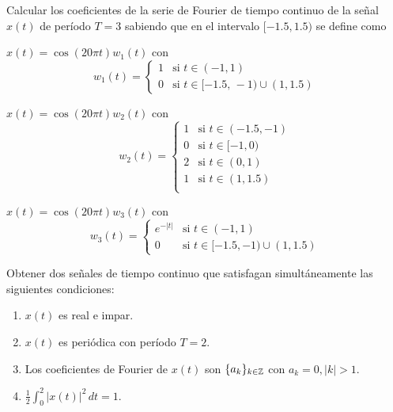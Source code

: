 \begin{ejercicio}
Calcular los coeficientes de la serie de Fourier de tiempo continuo de la señal $x(t)$ de período $T=3$ sabiendo que en el intervalo $[-1.5,1.5)$ se define como

\inciso $x(t) = \cos(20\pi t)w_1(t)$ con \begin{equation*}
    w_1(t) = \begin{cases}
    1 & \mbox{si } t \in (-1,1) \\
    0 & \mbox{si } t \in [-1.5,\,-1) \cup (1,1.5)
    \end{cases}
\end{equation*}

\inciso $x(t) = \cos(20\pi t)w_2(t)$ con \begin{equation*}
    w_2(t) = \begin{cases}
    1 & \mbox{si } t \in (-1.5,-1) \\
    0 & \mbox{si } t \in [-1,0) \\
    2 & \mbox{si } t \in (0,1) \\
    1 & \mbox{si } t \in (1,1.5) \\
    \end{cases}
\end{equation*}

\inciso $x(t) = \cos(20\pi t)w_3(t)$ con \begin{equation*}
    w_3(t) = \begin{cases}
    e^{-|t|} & \mbox{si } t \in (-1,1) \\
    0 & \mbox{si } t \in [-1.5,-1) \cup (1,1.5)
    \end{cases}
\end{equation*}
\end{ejercicio}


\begin{ejercicio}
    Obtener dos señales de tiempo continuo que satisfagan simultáneamente las siguientes condiciones:
    \begin{enumerate}
        \item $x(t)$ es real e impar.
        \item $x(t)$ es periódica con período $T=2$.
        \item Los coeficientes de Fourier de $x(t)$ son $\{a_k\}_{k \in \mathbb{Z}}$ con $a_k = 0, |k| > 1$.
        \item $\frac{1}{2} \int_{0}^{2} |x(t)|^2 \, dt = 1$.
    \end{enumerate}
\end{ejercicio}

